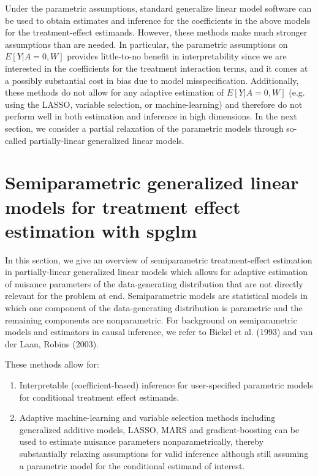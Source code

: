 \documentclass{article}
\begin{document}
Under the parametric assumptions, standard generalize linear model software can be used to obtain estimates and inference for the coefficients in the above models for the treatment-effect estimands. However, these methods make much stronger assumptions than are needed. In particular, the parametric assumptions on $E[Y|A=0,W]$ provides little-to-no benefit in interpretability since we are interested in the coefficients for the treatment interaction terms, and it comes at a possibly substantial cost in bias due to model misspecification. Additionally, these methods do not allow for any adaptive estimation of $E[Y|A=0,W]$ (e.g. using the LASSO, variable selection, or machine-learning) and therefore do not perform well in both estimation and inference in high dimensions. In the next section, we consider a partial relaxation of the parametric models through so-called partially-linear generalized linear models.




\section{Semiparametric generalized linear models for treatment effect estimation  with spglm}

In this section, we give an overview of semiparametric treatment-effect estimation in partially-linear generalized linear models which allows for adaptive estimation of nuisance parameters of the data-generating distribution that are not directly relevant for the problem at end. Semiparametric models are statistical models in which one component of the data-generating distribution is parametric and the remaining components are nonparametric. For background on semiparametric models and estimators in causal inference, we refer to Bickel et al. (1993) and van der Laan, Robins (2003).\nocite{vanderlaanunified}\nocite{bickel1993efficient}



These methods allow for:
\begin{enumerate}
\item Interpretable (coefficient-based) inference for user-specified parametric models for conditional treatment effect estimands.
\item Adaptive machine-learning and variable selection methods including generalized additive models, LASSO, MARS and gradient-boosting can be used to estimate nuisance parameters nonparametrically, thereby substantially relaxing assumptions for valid inference although still assuming a parametric model for the conditional estimand of interest.
\end{enumerate}
\end{document}
